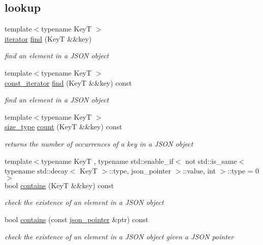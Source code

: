 \subsection*{lookup}
\begin{DoxyCompactItemize}
\item 
{\footnotesize template$<$typename KeyT $>$ }\\\mbox{\hyperlink{classnlohmann_1_1basic__json_a099316232c76c034030a38faa6e34dca}{iterator}} \mbox{\hyperlink{classnlohmann_1_1basic__json_a89eb3928f57903677051c80534be9cb1}{find}} (KeyT \&\&key)
\begin{DoxyCompactList}\small\item\em find an element in a J\+S\+ON object \end{DoxyCompactList}\item 
{\footnotesize template$<$typename KeyT $>$ }\\\mbox{\hyperlink{classnlohmann_1_1basic__json_a41a70cf9993951836d129bb1c2b3126a}{const\+\_\+iterator}} \mbox{\hyperlink{classnlohmann_1_1basic__json_ae625a0647486edf2bb38c849ca67f934}{find}} (KeyT \&\&key) const
\begin{DoxyCompactList}\small\item\em find an element in a J\+S\+ON object \end{DoxyCompactList}\item 
{\footnotesize template$<$typename KeyT $>$ }\\\mbox{\hyperlink{classnlohmann_1_1basic__json_a39f2cd0b58106097e0e67bf185cc519b}{size\+\_\+type}} \mbox{\hyperlink{classnlohmann_1_1basic__json_a0d74bfcf65662f1d66d14c34b0027098}{count}} (KeyT \&\&key) const
\begin{DoxyCompactList}\small\item\em returns the number of occurrences of a key in a J\+S\+ON object \end{DoxyCompactList}\item 
{\footnotesize template$<$typename KeyT , typename std\+::enable\+\_\+if$<$ not std\+::is\+\_\+same$<$ typename std\+::decay$<$ Key\+T $>$\+::type, json\+\_\+pointer $>$\+::value, int $>$\+::type  = 0$>$ }\\bool \mbox{\hyperlink{classnlohmann_1_1basic__json_a9286acdc0578fc66e9346323e69fc0e3}{contains}} (KeyT \&\&key) const
\begin{DoxyCompactList}\small\item\em check the existence of an element in a J\+S\+ON object \end{DoxyCompactList}\item 
bool \mbox{\hyperlink{classnlohmann_1_1basic__json_ab23b04802eb9da97dc3f664e54e09cb3}{contains}} (const \mbox{\hyperlink{classnlohmann_1_1basic__json_a6886a5001f5b449ad316101a311ce536}{json\+\_\+pointer}} \&ptr) const
\begin{DoxyCompactList}\small\item\em check the existence of an element in a J\+S\+ON object given a J\+S\+ON pointer \end{DoxyCompactList}\end{DoxyCompactItemize}
